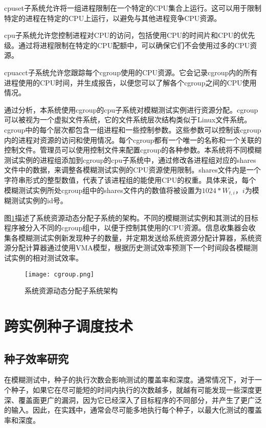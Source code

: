 \documentclass[master]{thesis-uestc}
\begin{document}
cpuset子系统允许将一组进程限制在一个特定的CPU集合上运行。这可以用于限制特定的进程在特定的CPU上运行，以避免与其他进程竞争CPU资源。

cpu子系统允许您控制进程对CPU的访问，包括使用CPU的时间片和CPU的优先级。通过将进程限制在特定的CPU配额中，可以确保它们不会使用过多的CPU资源。

cpuacct子系统允许您跟踪每个cgroup使用的CPU资源。它会记录cgroup内的所有进程使用的CPU时间，并生成报告，以便您可以了解各个cgroup之间的CPU使用情况。

通过分析，本系统使用cgroup的cpu子系统对模糊测试实例进行资源分配。cgroup可以被视为一个虚拟文件系统，它的文件系统层次结构类似于Linux文件系统。cgroup中的每个层次都包含一组进程和一些控制参数。这些参数可以控制该cgroup内的进程对资源的访问和使用情况。每个cgroup都有一个唯一的名称和一个关联的控制文件。管理员可以使用控制文件来配置cgroup的各种参数。本系统将不同模糊测试实例的进程组添加到cgroup的cpu子系统中，通过修改各进程组对应的shares文件中的数据，来调整各模糊测试实例的CPU资源使用限制。shares文件内是一个字符串形式的整型数值，代表了该进程组的能使用CPU的权重。具体来说，每个模糊测试实例所处cgroup组中的shares文件内的数值将被设置为$1024 * W_{t,i}$，$i$为模糊测试实例的id号。

图\ref{cgroup}描述了系统资源动态分配子系统的架构。不同的模糊测试实例和其测试的目标程序被分入不同的cgroup组中，以便于控制其使用的CPU资源。信息收集器会收集各模糊测试实例新发现种子的数量，并定期发送给系统资源分配计算器，系统资源分配计算器通过使用VMA模型，根据历史测试效率预测下一个时间段各模糊测试实例的相对测试效率。

\begin{figure}[!htbp]
    \vspace{6pt}
    \centering
    \texttt{[image: cgroup.png]}
    \caption{系统资源动态分配子系统架构}
    \label{cgroup}
\end{figure}

\section{跨实例种子调度技术}

\subsection{种子效率研究}

在模糊测试中，种子的执行次数会影响测试的覆盖率和深度。通常情况下，对于一个种子，如果它在尽可能短的时间内执行的次数越多，就越有可能发现一些深度更深、覆盖面更广的漏洞，因为它已经深入了目标程序的不同部分，并产生了更广泛的输入。因此，在实践中，通常会尽可能多地执行每个种子，以最大化测试的覆盖率和深度。
\end{document}
